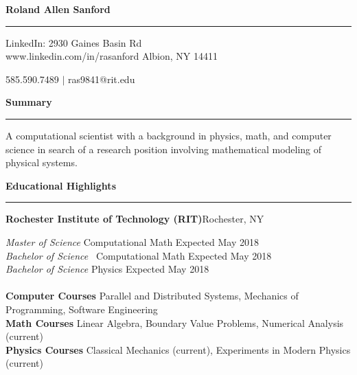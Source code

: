 \documentclass{article}
\newcommand{\fullbar}{\rule{\textwidth}{0.4pt}} %
\newcommand{\heading}[1]{{\Large\textbf{#1}\vspace{-.2cm}\newline\fullbar}} %
\newcommand{\secspace}{.3 cm}
\begin{document}
\heading{Roland Allen Sanford}
LinkedIn: \hfill	2930 Gaines Basin Rd\\
www.linkedin.com/in/rasanford \hfill	Albion, NY 14411\\
\begin{flushright}
	\vspace{-.65cm}
	585.590.7489 $|$ ras9841@rit.edu\\
\end{flushright}
	
\heading{Summary}
\begin{flushleft}
	A computational scientist with a background in physics, math, and computer science in search of a research position involving mathematical modeling of physical systems.
\end{flushleft}  

\vspace{\secspace}
\heading{Educational Highlights}
\begin{flushleft}
	\textbf{Rochester Institute of Technology (RIT)}\hfill Rochester, NY
\end{flushleft}
\textit{Master of Science} \hfill \quad Computational Math \hfill Expected May 2018 \\
\textit{Bachelor of Science} \hfill \ Computational Math \hfill Expected May 2018 \\
\textit{Bachelor of Science} \hfill Physics \hfill Expected May 2018 \\\\
\textbf{Computer Courses} \hfill Parallel and Distributed Systems, Mechanics of Programming, Software Engineering\\
\textbf{Math Courses} \hfill Linear Algebra, Boundary Value Problems, Numerical Analysis (current)\\
\textbf{Physics Courses} \hfill Classical Mechanics (current), Experiments in Modern Physics (current)\\
\end{document}
